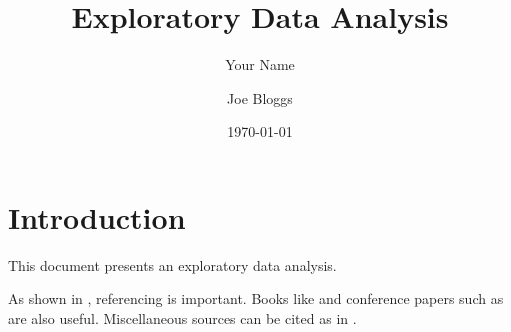 \documentclass{article}
\title{Exploratory Data Analysis}
\author{Your Name}
\date{\today}
\begin{document}
\author{Joe Bloggs}

\maketitle{}

\section{Introduction}
This document presents an exploratory data analysis.

As shown in \cite{smith2020example}, referencing is important.
Books like \cite{doe2019sample} and conference papers
such as \cite{johnson2018conference} are also useful.
Miscellaneous sources can be cited as in \cite{random2021misc}.



\end{document}
